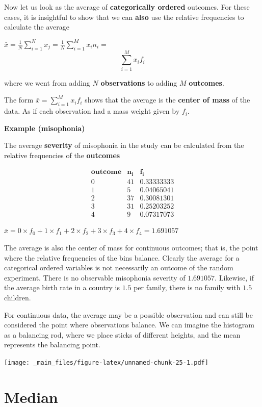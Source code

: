 \documentclass[
]{book}
\begin{document}
Now let us look as the average of \textbf{categorically ordered} outcomes. For these cases, it is insightful to show that we can \textbf{also} use the relative frequencies to calculate the average

\(\bar{x}=\frac{1}{ N}\sum_{i=1}^N x_j =\frac{1}{N}\sum_{i=1}^M x_i n_ {i}=\)
\[\sum_{i=1}^M x_i f_{i}\]

where we went from adding \(N\) \textbf{observations} to adding \(M\) \textbf{outcomes}.

The form \(\bar{x}= \sum_{i = 1}^M x_i f_i\) shows that the average is the \textbf{center of mass} of the data. As if each observation had a mass weight given by \(f_i\).

\textbf{Example (misophonia)}

The average \textbf{severity} of misophonia in the study can be calculated from the relative frequencies of the \textbf{outcomes}

\[
\begin{array}{ccc}
\mathbf{outcome} & \mathbf{n_i} & \mathbf{f_i} \\
0   & 41    & 0.33333333  \\
1   & 5     & 0.04065041  \\
2   & 37    & 0.30081301  \\ 
3   & 31    & 0.25203252  \\
4   & 9     & 0.07317073   
\end{array}
\]

\(\bar{x}=0\times f_ {0}+ 1\times f_{1}+2 \times f_{2}+3 \times f_{3}+4 \times f_{4}=1.691057\)

The average is also the center of mass for continuous outcomes; that is, the point where the relative frequencies of the bins balance. Clearly the average for a categorical ordered variables is not necessarily an outcome of the random experiment. There is no observable misophonia severity of \(1.691057\). Likewise, if the average birth rate in a country is \(1.5\) per family, there is no family with \(1.5\) children.

For continuous data, the average may be a possible observation and can still be considered the point where observations balance. We can imagine the histogram as a balancing rod, where we place sticks of different heights, and the mean represents the balancing point.

\texttt{[image: \_main\_files/figure-latex/unnamed-chunk-25-1.pdf]}

\hypertarget{median}{%
\section{Median}\label{median}}
\end{document}

